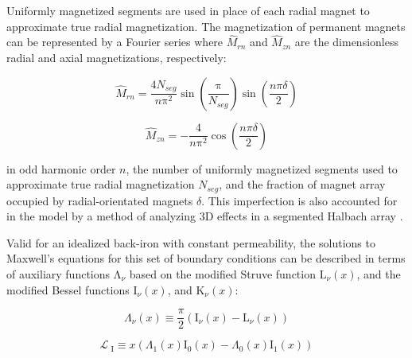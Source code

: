         
        Uniformly magnetized segments are used in place of each radial magnet to approximate true radial magnetization. The magnetization of permanent magnets can be represented by a Fourier series where ${\hat M}_{rn}$ and  ${\hat M}_{zn}$ are the dimensionless radial and axial magnetizations, respectively:


        \begin{equation}
            {\hat M}_{rn}=\frac{4N_{seg}}{n\mathrm\pi^2}\sin\left(\frac{\mathrm\pi}{N_{seg}}\right)\sin\left(\frac{n\pi\delta}2\right)
            \label{eq:Mrn}
        \end{equation}
        
        
        \begin{equation}
            {\hat M}_{zn}=-\frac4{n\mathrm\pi^2}\cos\left(\frac{n\pi\delta}2\right)
            \label{eq:Mzn}
        \end{equation}
        
        
        in odd harmonic order $n$, the number of uniformly magnetized segments used to approximate true radial magnetization $N_{seg}$, and the fraction of magnet array occupied by radial-orientated magnets $\delta$. This imperfection is also accounted for in the model by a method of analyzing 3D effects in a segmented Halbach array \cite{Meessen2011}.


        Valid for an idealized back-iron with constant permeability, the solutions to Maxwell's equations for this set of boundary conditions can be described in terms of auxiliary functions ${\mathrm\Lambda}_{\nu}$ based on the modified Struve function ${\mathrm{L}_{\nu}}(x)$, and the modified Bessel functions ${\mathrm I}_{\nu}(x)$, and ${\mathrm K}_{\nu}(x)$:
        
        
        \begin{equation}
            {\Lambda_{\nu}}\left( x \right) \equiv \frac{\pi }{2}\left( {{\mathrm{I}_{\nu}}\left( x \right) - {\mathrm{L}_{\nu}}\left( x \right)} \right)
            \label{eq:Axiliary function}
        \end{equation}
        
        \begin{equation}
            {\mathcal{L}_{{\textrm{ I}}}} \equiv x\left( {{\Lambda _1}\left( x \right){\mathrm{I}_0}\left( x \right) - {\Lambda _0}\left( x \right){\mathrm{I}_1}\left( x \right)} \right)
            \label{eq:bessel function 1}
        \end{equation}
        
